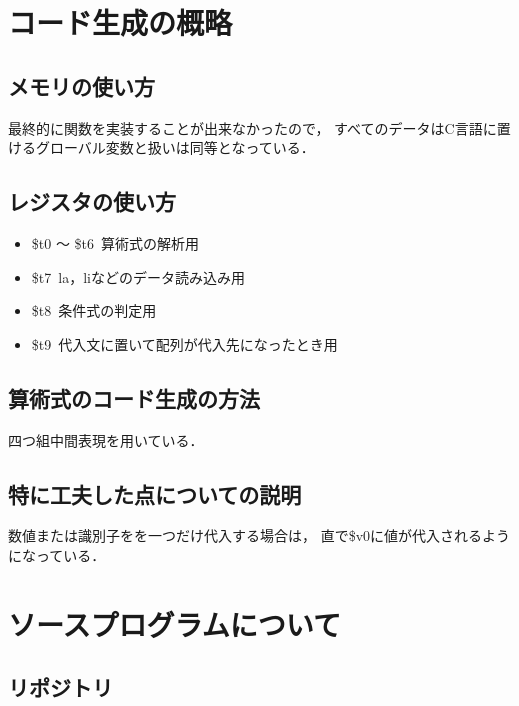 \documentclass[11pt,a4j]{jarticle}
\begin{document}

\section{コード生成の概略}

\subsection{メモリの使い方}

最終的に関数を実装することが出来なかったので，
すべてのデータはC言語に置けるグローバル変数と扱いは同等となっている．


\subsection{レジスタの使い方}

  \begin{itemize}
  \item \$t0 ～ \$t6~算術式の解析用
  \item \$t7~la，liなどのデータ読み込み用
  \item \$t8~条件式の判定用
  \item \$t9~代入文に置いて配列が代入先になったとき用
  \end{itemize}

\subsection{算術式のコード生成の方法}

四つ組中間表現を用いている．


\subsection{特に工夫した点についての説明}

数値または識別子をを一つだけ代入する場合は，
直で\$v0に値が代入されるようになっている．




\section{ソースプログラムについて}

\subsection{リポジトリ}
\end{document}
